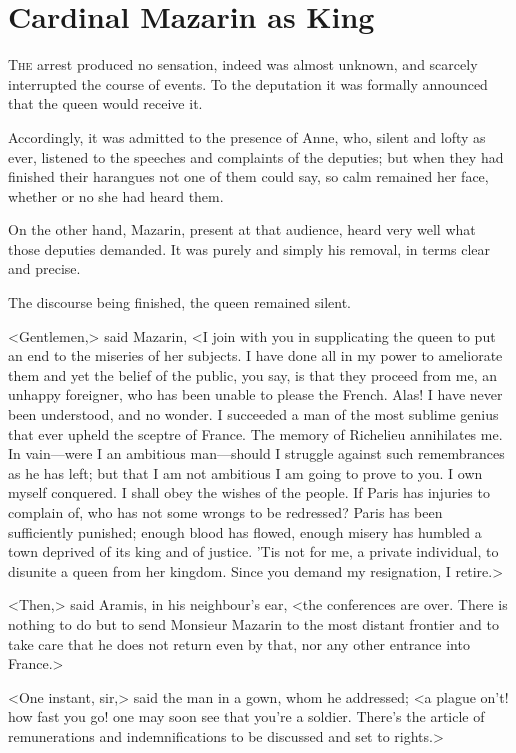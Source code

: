\chapter{Cardinal Mazarin as King}

 \lettrine{T}{he} arrest produced no sensation, indeed was almost unknown, and scarcely interrupted the course of events. To the deputation it was formally announced that the queen would receive it.

\zz
Accordingly, it was admitted to the presence of Anne, who, silent and lofty as ever, listened to the speeches and complaints of the deputies; but when they had finished their harangues not one of them could say, so calm remained her face, whether or no she had heard them.

On the other hand, Mazarin, present at that audience, heard very well what those deputies demanded. It was purely and simply his removal, in terms clear and precise.

The discourse being finished, the queen remained silent.

<Gentlemen,> said Mazarin, <I join with you in supplicating the queen to put an end to the miseries of her subjects. I have done all in my power to ameliorate them and yet the belief of the public, you say, is that they proceed from me, an unhappy foreigner, who has been unable to please the French. Alas! I have never been understood, and no wonder. I succeeded a man of the most sublime genius that ever upheld the sceptre of France. The memory of Richelieu annihilates me. In vain—were I an ambitious man—should I struggle against such remembrances as he has left; but that I am not ambitious I am going to prove to you. I own myself conquered. I shall obey the wishes of the people. If Paris has injuries to complain of, who has not some wrongs to be redressed? Paris has been sufficiently punished; enough blood has flowed, enough misery has humbled a town deprived of its king and of justice. 'Tis not for me, a private individual, to disunite a queen from her kingdom. Since you demand my resignation, I retire.>

<Then,> said Aramis, in his neighbour's ear, <the conferences are over. There is nothing to do but to send Monsieur Mazarin to the most distant frontier and to take care that he does not return even by that, nor any other entrance into France.>

<One instant, sir,> said the man in a gown, whom he addressed; <a plague on't! how fast you go! one may soon see that you're a soldier. There's the article of remunerations and indemnifications to be discussed and set to rights.>

